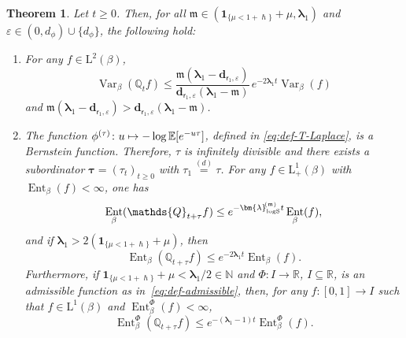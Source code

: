 \documentclass[JEP,XML,SOM,Unicode]{cedram}
\let\epsilon\varepsilon
\newcommand\mto{\mathchoice{\longmapsto}{\mapsto}{\mapsto}{\mapsto}}
\theoremstyle{plain}
\newtheorem{theorem}{Theorem}[section]
\theoremstyle{definition}
\DeclareMathOperator{\Var}{Var}
\DeclareMathOperator{\Ent}{Ent}
\newcommand{\E}{\mathbb{E}}
\newcommand{\N}{\mathbb{N}}
\newcommand{\R}{\mathbb{R}}
\newcommand{\J}{\mathds{Q}}
\newcommand{\Leb}{\mathrm{L}}
\newcommand{\m}{\mathfrak{m}}
\newcommand{\dpt}{\bm{d}_{\vat,\epsilon}}
\newcommand{\lam}{{\bm{\lambda}_1}}
\newcommand{\vat}{{\mathsf{r}_1}}
\newcommand{\logSob}[1][\mo]{\bm{\lambda}_{\mathrm{logS}}^{\hspace{-0.06cm}(#1)}}
\let\h\hslash
\let\mo\mu
\let\bpsi\beta
\begin{document}
\begin{theorem}
\label{thm:convergence-equilibrium} Let $t \geq 0$. Then, for all $\m \in (\bm{1}_{\{\mo < 1+\h\}} + \mo ,\lam)$
and $\epsilon \in (0,d_\phi) \cup \{d_\phi\}$, the following hold:
\begin{enumerate}
\item \label{item-1:thm:convergence-equilibrium} For any $f \in \Leb^2(\bpsi)$,
\begin{equation*}
\Var_\bpsi(\J_t f) \leq \frac{\m(\lam-\dpt)}{\dpt(\lam-\m)}\, e^{-2\lam t} \Var_\bpsi(f)
\end{equation*}
and $\m(\lam-\dpt) > \dpt(\lam-\m)$.
\item \label{item-2:thm:convergence-equilibrium}
The function $\phi^{(\tau)} \colon u \mto - \log \E[e^{-u \tau}]$, defined in \eqref{eq:def-T-Laplace}, is a Bernstein function. Therefore,
$\tau$ is infinitely divisible and there exists a subordinator $\bm{\tau} = (\tau_t)_{t \geq 0}$ with $\tau_1 \stackrel{(d)}{=} \tau$. For any $f \in \Leb^1_+(\bpsi)$ with $\Ent_\bpsi(f) < \infty$, one has
\begin{equation*}
\Ent_\bpsi(\J_{t+\tau} f) \leq e^{- \logSob[\m] t} \Ent_\bpsi(f),
\end{equation*}
and if $\lam > 2(\bm{1}_{\{\mo < 1+\h \}} + \mo)$, then
\begin{equation*}
\Ent_\bpsi(\J_{t+\tau} f) \leq e^{- 2 \lam t} \Ent_\bpsi(f).
\end{equation*}
Furthermore, if $\bm{1}_{\{\mo < 1+\h \}} + \mo < \lam/2 \in \N$ and $\Phi \colon I \to \R$, $I \subseteq \R$, is an admissible function as in~\eqref{eq:def-admissible}, then, for any $f \colon [0,1]\!\to\! I$ such that $f \!\in\!\Leb^1(\bpsi)$ and \hbox{$\Ent_\bpsi^\Phi(f)\!<\!\infty$},
\begin{equation*}
\Ent_\bpsi^\Phi(\J_{t+\tau} f) \leq e^{-(\lam-1)t} \Ent_\bpsi^\Phi(f).
\end{equation*}
\end{enumerate}
\end{theorem}
\end{document}
